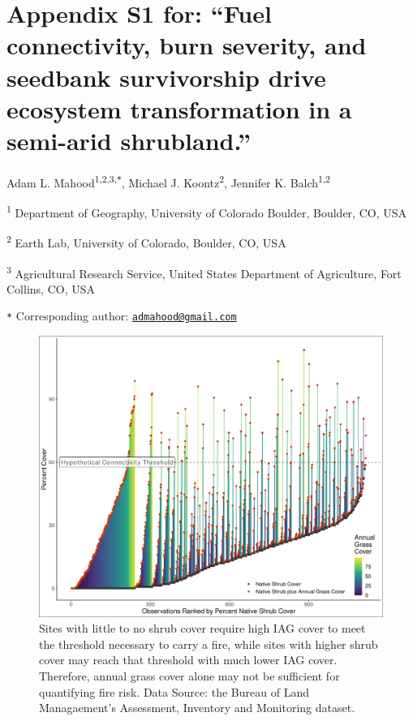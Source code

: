 \documentclass[
  12pt,
]{article}
\author{}
\date{\vspace{-2.5em}}
\begin{document}
\renewcommand{\thetable}{S\arabic{table}}      \setcounter{table}{0} \renewcommand{\thefigure}{S\arabic{figure}}

\hypertarget{appendix-s1-for-fuel-connectivity-burn-severity-and-seedbank-survivorship-drive-ecosystem-transformation-in-a-semi-arid-shrubland.}{%
\section{Appendix S1 for: ``Fuel connectivity, burn severity, and
seedbank survivorship drive ecosystem transformation in a semi-arid
shrubland.''}\label{appendix-s1-for-fuel-connectivity-burn-severity-and-seedbank-survivorship-drive-ecosystem-transformation-in-a-semi-arid-shrubland.}}

Adam L. Mahood\textsuperscript{1,2,3,\texttt{*}}, Michael J.
Koontz\textsuperscript{2}, Jennifer K. Balch\textsuperscript{1,2}

\small

\textsuperscript{1} Department of Geography, University of Colorado
Boulder, Boulder, CO, USA

\textsuperscript{2} Earth Lab, University of Colorado, Boulder, CO, USA

\textsuperscript{3} Agricultural Research Service, United States
Department of Agriculture, Fort Collins, CO, USA

\texttt{*} Corresponding author:
\href{mailto:admahood@gmail.com}{\nolinkurl{admahood@gmail.com}}

\normalsize

\newpage

\begin{figure}
\centering
\includegraphics{images/connectivity_is_not_brte_rank_double.png}
\caption{Sites with little to no shrub cover require high IAG cover to
meet the threshold necessary to carry a fire, while sites with higher
shrub cover may reach that threshold with much lower IAG cover.
Therefore, annual grass cover alone may not be sufficient for
quantifying fire risk. Data Source: the Bureau of Land Managaement's
Assessment, Inventory and Monitoring dataset.}
\end{figure}
\end{document}

